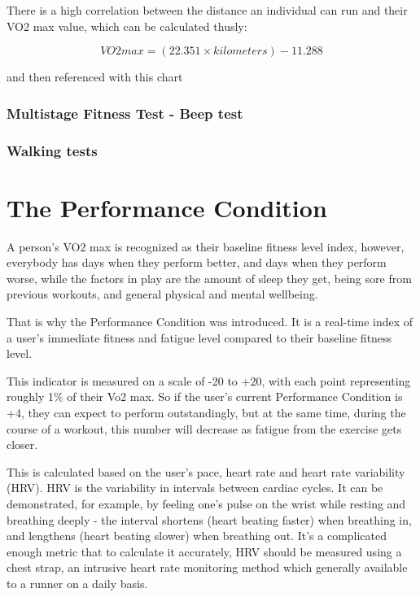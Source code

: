 There is a high correlation between the distance an individual can run and their VO2 max value, which can be calculated thusly:

\[VO2max = (22.351 \times kilometers) - 11.288\]

and then referenced with this chart\cite{cooper-vo2max}



\subsubsection*{Multistage Fitness Test - Beep test}
\subsubsection*{Walking tests}

\section{The Performance Condition}

A person's VO2 max is recognized as their baseline fitness level index, however, everybody has days when they perform better, and days when they perform worse, while the factors in play are the amount of sleep they get, being sore from previous workouts, and general physical and mental wellbeing.

That is why the Performance Condition was introduced.
It is a real-time index of a user's immediate fitness and fatigue level compared to their baseline fitness level.

This indicator is measured on a scale of -20 to +20, with each point representing roughly 1\% of their Vo2 max.
So if the user's current Performance Condition is +4, they can expect to perform outstandingly,
but at the same time, during the course of a workout, this number will decrease as fatigue from the exercise gets closer.\cite{performance-condition-firstbeat}\cite{performance-condition-garmin}

This is calculated based on the user's pace, heart rate and heart rate variability (HRV).
HRV is the variability in intervals between cardiac cycles.
It can be demonstrated, for example, by feeling one's pulse on the wrist while resting and breathing deeply - the interval shortens (heart beating faster) when breathing in, and lengthens (heart beating slower) when breathing out.\cite{hrv}
It's a complicated enough metric that to calculate it accurately, HRV should be measured using a chest strap,
an intrusive heart rate monitoring method which generally available to a runner on a daily basis.

